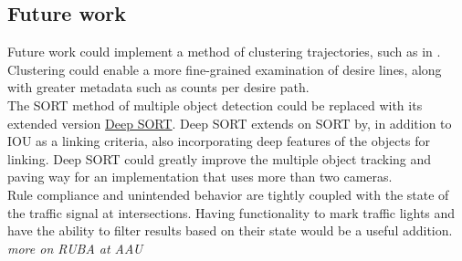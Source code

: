 \subsection{Future work}
Future work could implement a method of clustering trajectories,
such as in \cite{gariel_trajectory_2011}. Clustering could enable a more fine-grained examination of desire lines,
along with greater metadata such as counts per desire path.
\ \\

The SORT method of multiple object detection could be replaced with its extended version \href{https://github.com/nwojke/deep_sort}{Deep SORT}.
Deep SORT extends on SORT by, in addition to IOU as a linking criteria, also incorporating
deep features of the objects for linking. Deep SORT could greatly improve the multiple object tracking
and paving way for an implementation that uses more than two cameras.
\ \\

Rule compliance and unintended behavior are tightly coupled with the state of the traffic signal at intersections. 
Having functionality to mark traffic lights and have the ability to filter results based on their state would
be a useful addition. \textit{more on RUBA at AAU}